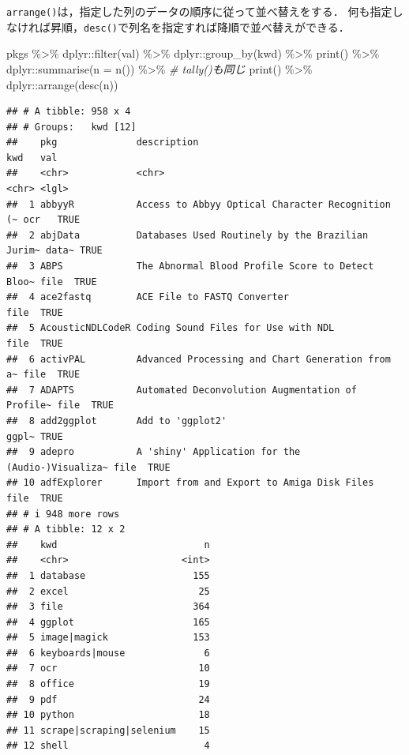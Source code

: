 \documentclass[
]{article}
\newenvironment{Shaded}{\begin{snugshade}}{\end{snugshade}}
\newcommand{\AttributeTok}[1]{\textcolor[rgb]{0.77,0.63,0.00}{#1}}
\newcommand{\CommentTok}[1]{\textcolor[rgb]{0.56,0.35,0.01}{\textit{#1}}}
\newcommand{\FunctionTok}[1]{\textcolor[rgb]{0.00,0.00,0.00}{#1}}
\newcommand{\NormalTok}[1]{#1}
\newcommand{\SpecialCharTok}[1]{\textcolor[rgb]{0.00,0.00,0.00}{#1}}
\begin{document}
\texttt{arrange()}は，指定した列のデータの順序に従って並べ替えをする．
何も指定しなければ昇順，\texttt{desc()}で列名を指定すれば降順で並べ替えができる．

\begin{Shaded}
\begin{Highlighting}[]
\NormalTok{pkgs }\SpecialCharTok{\%\textgreater{}\%}
\NormalTok{  dplyr}\SpecialCharTok{::}\FunctionTok{filter}\NormalTok{(val) }\SpecialCharTok{\%\textgreater{}\%}
\NormalTok{  dplyr}\SpecialCharTok{::}\FunctionTok{group\_by}\NormalTok{(kwd) }\SpecialCharTok{\%\textgreater{}\%}
  \FunctionTok{print}\NormalTok{() }\SpecialCharTok{\%\textgreater{}\%}
\NormalTok{  dplyr}\SpecialCharTok{::}\FunctionTok{summarise}\NormalTok{(}\AttributeTok{n =} \FunctionTok{n}\NormalTok{()) }\SpecialCharTok{\%\textgreater{}\%} \CommentTok{\# tally()も同じ}
  \FunctionTok{print}\NormalTok{() }\SpecialCharTok{\%\textgreater{}\%}
\NormalTok{  dplyr}\SpecialCharTok{::}\FunctionTok{arrange}\NormalTok{(}\FunctionTok{desc}\NormalTok{(n))}
\end{Highlighting}
\end{Shaded}

\begin{verbatim}
## # A tibble: 958 x 4
## # Groups:   kwd [12]
##    pkg              description                                      kwd   val  
##    <chr>            <chr>                                            <chr> <lgl>
##  1 abbyyR           Access to Abbyy Optical Character Recognition (~ ocr   TRUE 
##  2 abjData          Databases Used Routinely by the Brazilian Jurim~ data~ TRUE 
##  3 ABPS             The Abnormal Blood Profile Score to Detect Bloo~ file  TRUE 
##  4 ace2fastq        ACE File to FASTQ Converter                      file  TRUE 
##  5 AcousticNDLCodeR Coding Sound Files for Use with NDL              file  TRUE 
##  6 activPAL         Advanced Processing and Chart Generation from a~ file  TRUE 
##  7 ADAPTS           Automated Deconvolution Augmentation of Profile~ file  TRUE 
##  8 add2ggplot       Add to 'ggplot2'                                 ggpl~ TRUE 
##  9 adepro           A 'shiny' Application for the (Audio-)Visualiza~ file  TRUE 
## 10 adfExplorer      Import from and Export to Amiga Disk Files       file  TRUE 
## # i 948 more rows
## # A tibble: 12 x 2
##    kwd                          n
##    <chr>                    <int>
##  1 database                   155
##  2 excel                       25
##  3 file                       364
##  4 ggplot                     165
##  5 image|magick               153
##  6 keyboards|mouse              6
##  7 ocr                         10
##  8 office                      19
##  9 pdf                         24
## 10 python                      18
## 11 scrape|scraping|selenium    15
## 12 shell                        4
\end{verbatim}
\end{document}
